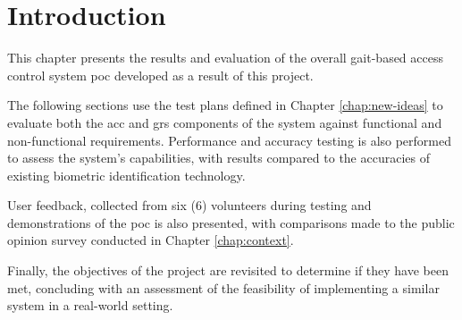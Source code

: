 \section{Introduction}
\label{sec:results-and-evaluation-introduction}

This chapter presents the results and evaluation of the overall gait-based access control system \ac{poc} developed as a result of this project.

The following sections use the test plans defined in Chapter \ref{chap:new-ideas} to evaluate both the \ac{acc} and \ac{grs} components of the system against functional and non-functional requirements.
Performance and accuracy testing is also performed to assess the system's capabilities, with results compared to the accuracies of existing biometric identification technology.

User feedback, collected from six (6) volunteers during testing and demonstrations of the \ac{poc} is also presented, with comparisons made to the public opinion survey conducted in Chapter \ref{chap:context}.

Finally, the objectives of the project are revisited to determine if they have been met, concluding with an assessment of the feasibility of implementing a similar system in a real-world setting.

